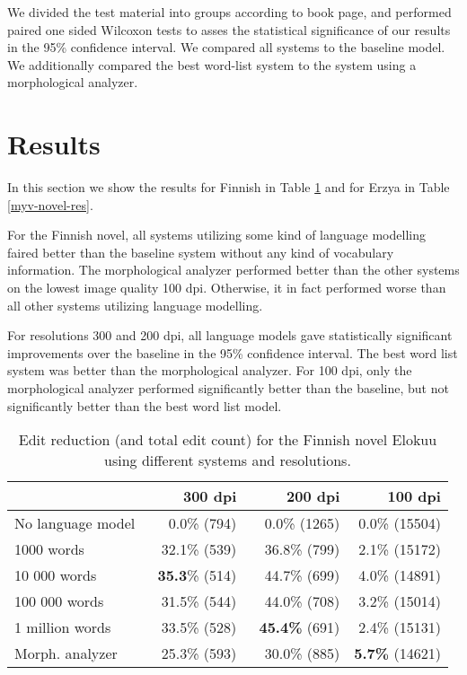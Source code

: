 \documentclass[b5paper]{article}
\begin{document}
We divided the test material into groups according to book page, and
performed paired one sided Wilcoxon tests to asses the statistical
significance of our results in the 95\% confidence interval. We
compared all systems to the baseline model. We additionally compared
the best word-list system to the system using a morphological
analyzer.

\section{Results}
\label{res}
In this section we show the results for Finnish in Table
\ref{fin-novel-res} and for Erzya in Table
\ref{myv-novel-res}. 

For the Finnish novel, all systems utilizing some kind of language
modelling faired better than the baseline system without any kind of
vocabulary information. The morphological analyzer performed better
than the other systems on the lowest image quality 100 dpi. Otherwise,
it in fact performed worse than all other systems utilizing language
modelling.

For resolutions 300 and 200 dpi, all language models gave
statistically significant improvements over the baseline in the 95\%
confidence interval. The best word list system was better than the
morphological analyzer. For 100 dpi, only the morphological analyzer
performed significantly better than the baseline, but not
significantly better than the best word list model.

\begin{table}[!htb]
\begin{center}
\begin{tabular}{lrrr}
\hline 
                  & 300 dpi & 200 dpi & 100 dpi \\
\hline 
No language model & ~0.0\% (794)          & ~0.0\% (1265)          & 0.0\% (15504)  \\
1000 words        & ~32.1\% (539)  & ~36.8\% (799)        & 2.1\% (15172)           \\
10 000 words      & {\bf ~35.3}\% (514)  & ~44.7\%  (699)  & 4.0\% (14891)          \\
100 000 words     & ~31.5\% (544)   & ~44.0\%  (708)  & 3.2\%  (15014)              \\
1 million words   & ~33.5\% (528)   & {\bf ~45.4\%} (691)  & 2.4\% (15131)          \\
Morph. analyzer   & ~25.3\% (593)    & ~30.0\% (885)     & {\bf 5.7\%} (14621)      \\
\hline 
\end{tabular}
\caption{Edit reduction (and total edit count) for the Finnish novel Elokuu using different systems and resolutions.}\label{fin-novel-res}
\end{center}
\end{table}
\end{document}
